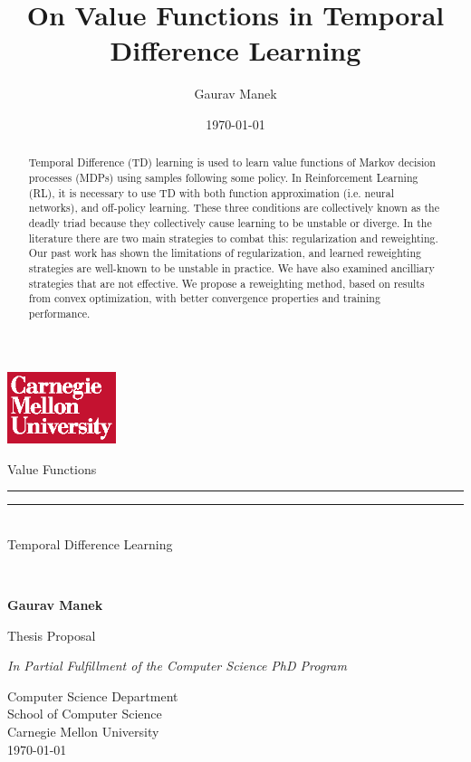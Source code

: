\documentclass[11pt]{article}
\title{ On Value Functions in Temporal Difference Learning }
\author{ Gaurav Manek }
\date{\today}
\begin{document}
\begin{titlepage}
    {
        \hfill\includegraphics[width=1.25in,trim=0 0 .125in .25in]{cmu/cmu-wordmark-square-w-on-r}
    }
    \begin{center}{\SourceSerifPro
        \vfill

        {\Huge\OpenSans
            {
                {Value Functions}\\[-1.em]
                \rule{0.25\textwidth}{1pt}
                \rule{0.25\textwidth}{1pt}\\[.5em]
                {Temporal Difference Learning}
            }
        }\\


        \vspace{0.25in}

        \textbf{\large Gaurav Manek}\\

        \vfill

        Thesis Proposal

        \textit{In Partial Fulfillment of the Computer Science PhD Program}

        \vspace{0.33in}
        Computer Science Department\\
        School of Computer Science\\
        Carnegie Mellon University\\
        \today

    }\end{center}
\end{titlepage}

\cleardoublepage

~\vfill
\begin{center}
    \begin{minipage}[c]{.7\textwidth}
        \begin{abstract}
            Temporal Difference (TD) learning is used to learn value functions of Markov decision processes (MDPs) using samples following some policy. In Reinforcement Learning (RL), it is necessary to use TD with both function approximation (i.e. neural networks), and off-policy learning. These three conditions are collectively known as the deadly triad because they collectively cause learning to be unstable or diverge. In the literature there are two main strategies to combat this: regularization and reweighting. Our past work has shown the limitations of regularization, and learned reweighting strategies are well-known to be unstable in practice. We have also examined ancilliary strategies that are not effective. We propose a reweighting method, based on results from convex optimization, with better convergence properties and training performance.
        \end{abstract}
    \end{minipage}
\end{center}
\end{document}
